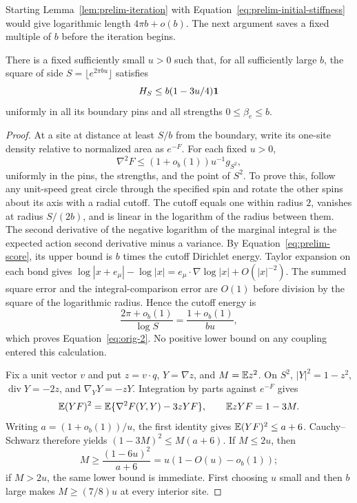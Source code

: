 Starting Lemma~\ref{lem:prelim-iteration} with
Equation~\eqref{eq:prelim-initial-stiffness} would give logarithmic
length $4\pi b+o(b)$. The next argument saves a fixed multiple of $b$
before the iteration begins.

\begin{lemma}\label{lem:prelim-initial-reduction}
There is a fixed sufficiently small $u>0$ such that, for all sufficiently
large $b$, the square of side $S=\lfloor e^{2\pi bu}\rfloor$ satisfies
\[
 H_S\le b(1-3u/4)\mathbf 1
\]
uniformly in all its boundary pins and all strengths $0\le\beta_e\le b$.
\end{lemma}

\begin{proof}
At a site at distance at least $S/b$ from the boundary, write its
one-site density relative to normalized area as $e^{-F}$.
For each fixed $u>0$,
\begin{equation}
 \nabla^2F\le(1+o_b(1))u^{-1}g_{S^2},
 \label{eq:orig-2}
\end{equation}
uniformly in the pins, the strengths, and the point of $S^2$.
To prove this, follow any unit-speed great circle through the specified
spin and rotate the other spins about its axis with a radial cutoff.
The cutoff equals one within radius $2$, vanishes at radius $S/(2b)$,
and is linear in the logarithm of the radius between them. The second
derivative of the negative logarithm of the marginal integral is the
expected action second derivative minus a variance. By
Equation~\eqref{eq:prelim-score}, its upper bound is $b$ times the
cutoff Dirichlet energy. Taylor expansion on each bond gives
$\log|x+e_\mu|-\log|x|=e_\mu\cdot\nabla\log|x|+O(|x|^{-2})$.
The summed square error and the integral-comparison error are $O(1)$
before division by the square of the logarithmic radius. Hence the
cutoff energy is
\[
 \frac{2\pi+o_b(1)}{\log S}
 =\frac{1+o_b(1)}{bu},
\]
which proves Equation~\eqref{eq:orig-2}. No positive lower bound on any
coupling entered this calculation.

Fix a unit vector $v$ and put $z=v\cdot q$, $Y=\nabla z$, and
$M=\mathbb E z^2$. On $S^2$,
$|Y|^2=1-z^2$, $\operatorname{div}Y=-2z$, and
$\nabla_YY=-zY$. Integration by parts against $e^{-F}$ gives
\begin{equation}
 \mathbb E(YF)^2=\mathbb E\{\nabla^2F(Y,Y)-3zYF\},\qquad
 \mathbb E zYF=1-3M.
 \label{eq:prelim-fisher-identities}
\end{equation}
Writing $a=(1+o_b(1))/u$, the first identity gives
$\mathbb E(YF)^2\le a+6$. Cauchy--Schwarz therefore yields
$(1-3M)^2\le M(a+6)$. If $M\le2u$, then
\[
 M\ge\frac{(1-6u)^2}{a+6}
   =u(1-O(u)-o_b(1));
\]
if $M>2u$, the same lower bound is immediate. First choosing $u$ small
and then $b$ large makes $M\ge(7/8)u$ at every interior site.


\end{proof}
